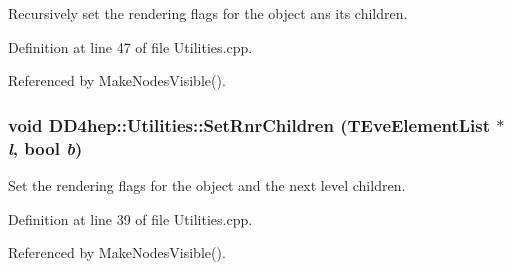Recursively set the rendering flags for the object ans its children. 

Definition at line 47 of file Utilities.cpp.

Referenced by MakeNodesVisible().\hypertarget{namespace_d_d4hep_1_1_utilities_a39b86ff9be41d39a9569a9a45c9484c2}{
\subsubsection[{SetRnrChildren}]{\setlength{\rightskip}{0pt plus 5cm}void DD4hep::Utilities::SetRnrChildren ({\bf TEveElementList} $\ast$ {\em l}, \/  bool {\em b})}}
\label{namespace_d_d4hep_1_1_utilities_a39b86ff9be41d39a9569a9a45c9484c2}


Set the rendering flags for the object and the next level children. 

Definition at line 39 of file Utilities.cpp.

Referenced by MakeNodesVisible().